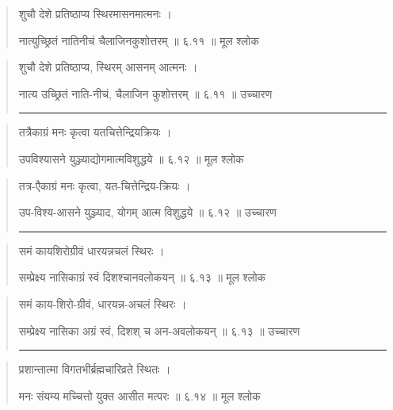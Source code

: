 \begin{quotation}  

शुचौ देशे प्रतिष्ठाप्य स्थिरमासनमात्मनः  ।  

नात्युच्छ्रितं नातिनीचं चैलाजिनकुशोत्तरम्‌  ॥ ६.११ ॥  मूल श्लोक
\end{quotation}

\begin{quotation}

शुचौ देशे प्रतिष्ठाप्य, स्थिरम् आसनम् आत्मनः  ।  

नात्य उच्छ्रितं नाति-नीचं, चैलाजिन कुशोत्तरम्‌  ॥ ६.११ ॥  उच्चारण

\noindent\rule{16cm}{0.4pt} 
\end{quotation}


\begin{quotation}  
तत्रैकाग्रं मनः कृत्वा यतचित्तेन्द्रियक्रियः  ।  

उपविश्यासने युञ्ज्याद्योगमात्मविशुद्धये  ॥ ६.१२ ॥  मूल श्लोक
\end{quotation}

\begin{quotation}

तत्र-एैकाग्रं मनः कृत्वा, यत-चित्तेन्द्रिय-क्रियः  ।  

उप-विश्य-आसने युञ्ज्याद, योगम् आत्म विशुद्धये  ॥ ६.१२ ॥  उच्चारण

\noindent\rule{16cm}{0.4pt} 
\end{quotation}


\begin{quotation}  

समं कायशिरोग्रीवं धारयन्नचलं स्थिरः  ।  

सम्प्रेक्ष्य नासिकाग्रं स्वं दिशश्चानवलोकयन्‌  ॥ ६.१३ ॥  मूल श्लोक
\end{quotation}

\begin{quotation}

समं काय-शिरो-ग्रीवं, धारयन्न-अचलं स्थिरः  ।  

सम्प्रेक्ष्य नासिका अग्रं स्वं, दिशश् च अन-अवलोकयन्‌  ॥ ६.१३ ॥  उच्चारण

\noindent\rule{16cm}{0.4pt} 
\end{quotation}


\begin{quotation}  

प्रशान्तात्मा विगतभीर्ब्रह्मचारिव्रते स्थितः  ।  

मनः संयम्य मच्चित्तो युक्त आसीत मत्परः  ॥ ६.१४ ॥  मूल श्लोक
\end{quotation}

